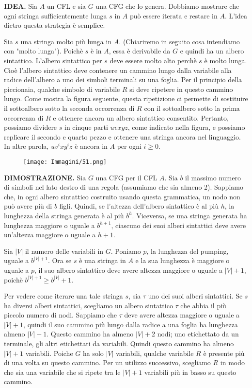 \documentclass{article}
\begin{document}
\textbf{IDEA.}
Sia $A$ un CFL e sia $G$ una CFG che lo genera.
Dobbiamo mostrare che ogni stringa sufficientemente lunga $s$ in $A$ può essere iterata e restare in $A$.
L'idea dietro questa strategia è semplice.

Sia $s$ una stringa molto più lunga in $A$.
(Chiariremo in seguito cosa intendiamo con "molto lunga").
Poichè $s$ è in $A$, essa è derivabile da $G$ e quindi ha un albero sintattico.
L'albero sintattico per $s$ deve essere molto alto perchè $s$ è molto lunga.
Cioè l'albero sintattico deve contenere un cammino lungo dalla variabile alla radice dell'albero a uno dei simboli terminali su una foglia.
Per il principio della piccionaia, qualche simbolo di variabile $R$ si deve ripetere in questo cammino lungo.
Come mostra la figura seguente, questa ripetizione ci permette di sostituire il sottoalbero sotto la seconda occorrenza di $R$ con il sottoalbero sotto la prima occorrenza di $R$ e ottenere ancora un albero sintattico consentito.
Pertanto, possiamo dividere $s$ in cinque parti $uvxyz$, come indicato nella figura, e possiamo replicare il secondo e quarto pezzo e ottenere una stringa ancora nel linguaggio.
In altre parola, $uv^ixy^iz$ è ancora in $A$ per ogni $i \geq 0$.

\begin{figure}[H]
    \centering
    \texttt{[image: Immagini/51.png]}
    \label{fig:pumping_lemma_example}
\end{figure}

\textbf{DIMOSTRAZIONE.}
Sia $G$ una CFG per il CFL $A$.
Sia $b$ il massimo numero di simboli nel lato destro di una regola (assumiamo che sia almeno 2).
Sappiamo che, in ogni albero sintattico costruito usando questa grammatica, un nodo non può avere più di $b$ figli.
Quindi, se l'altezza dell'albero sintattico è al più $h$, la lunghezza della stringa generata è al più $b^h$.
Viceversa, se una stringa generata ha lunghezza maggiore o uguale a $b^{h+1}$, ciascuno dei suoi alberi sintattici deve avere un'altezza maggiore o uguale a $h+1$.

Sia $|V|$ il numero delle variabili in $G$. Poniamo $p$, la lunghezza del pumping, uguale a $b^{|V|+1}$.
Ora se $s$ è una stringa in $A$ e la sua lunghezza è maggiore o uguale a $p$, il suo albero sintattico deve avere altezza maggiore o uguale a $|V|+1$, poichè $b^{|V|+1} \geq b^{|V|}+1$.

Per vedere come iterare una tale stringa $s$, sia $\tau$ uno dei suoi alberi sintattici.
Se $s$ ha diversi alberi sintattici, scegliamo un albero sintattico $\tau$ che abbia il più piccolo numero di nodi.
Sappiamo che $\tau$ deve avere altezza maggiore o uguale a $|V|+1$, quindi il suo cammino più lungo dalla radice a una foglia ha lunghezza almeno $|V|+1$.
Questo cammino ha almeno $|V|+2$ nodi; uno etichettato da un terminale, gli altri etichettati da variabili. Quindi questo cammino ha almeno $|V| +1$ variabili.
Poiche $G$ ha solo $|V|$ variabili, qualche variabile $R$ è presente più di una volta su questo cammino.
Per un utilizzo successivo, scegliamo $R$ in modo che sia una variabile che si ripete tra le $|V|+1$ variabili più in basso su questo cammino.
\end{document}
